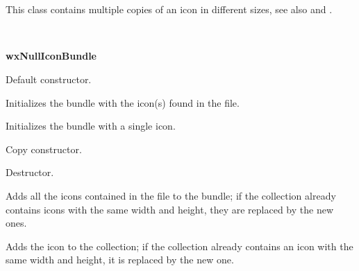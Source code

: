 \section{}\label{wxiconbundle}

This class contains multiple copies of an icon in different sizes,
see also  and
.


\\


{\bf wxNullIconBundle}



\label{wxiconbundlewxiconbundle}


Default constructor.


Initializes the bundle with the icon(s) found in the file.


Initializes the bundle with a single icon.


Copy constructor.


\label{wxiconbundledtor}


Destructor.


\label{wxiconbundleaddicon}


Adds all the icons contained in the file to the bundle;
if the collection already contains icons with the same
width and height, they are replaced by the new ones.


Adds the icon to the collection; if the collection already
contains an icon with the same width and height, it is
replaced by the new one.


